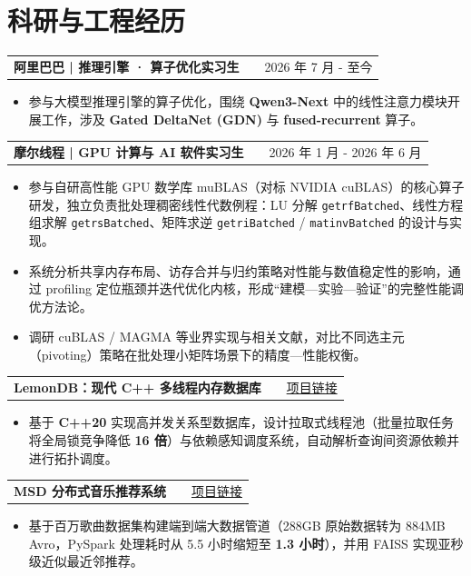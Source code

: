 \documentclass[a4paper,12pt]{article}
\makeatletter
\newenvironment{joblong}[2]
    {
    \begin{tabularx}{\linewidth}{@{}l X r@{}}
    \textbf{#1} & \hfill &  #2 \\[3.75pt]
    \end{tabularx}
    \begin{minipage}[t]{\linewidth}
    \begin{itemize}[nosep,after=\strut, leftmargin=1em, itemsep=3pt,label=--]
    }
    {
    \end{itemize}
    \end{minipage}    
    }
\makeatother
\begin{document}

\section{科研与工程经历}

\begin{joblong}{阿里巴巴 | 推理引擎 · 算子优化实习生}{2026 年 7 月 - 至今}
\item 参与大模型推理引擎的算子优化，围绕 \textbf{Qwen3-Next} 中的线性注意力模块开展工作，涉及 \textbf{Gated DeltaNet (GDN)} 与 \textbf{fused-recurrent} 算子。
\end{joblong}

\begin{joblong}{摩尔线程 | GPU 计算与 AI 软件实习生}{2026 年 1 月 - 2026 年 6 月}
\item 参与自研高性能 GPU 数学库 muBLAS（对标 NVIDIA cuBLAS）的核心算子研发，独立负责批处理稠密线性代数例程：LU 分解 \texttt{getrfBatched}、线性方程组求解 \texttt{getrsBatched}、矩阵求逆 \texttt{getriBatched} / \texttt{matinvBatched} 的设计与实现。
\item 系统分析共享内存布局、访存合并与归约策略对性能与数值稳定性的影响，通过 profiling 定位瓶颈并迭代优化内核，形成“建模—实验—验证”的完整性能调优方法论。
\item 调研 cuBLAS / MAGMA 等业界实现与相关文献，对比不同选主元（pivoting）策略在批处理小矩阵场景下的精度—性能权衡。
\end{joblong}

\begin{joblong}{LemonDB：现代 C++ 多线程内存数据库}{\href{https://github.com/zty2004/ECE4821Jp2}{项目链接}}
\item 基于 \textbf{C++20} 实现高并发关系型数据库，设计拉取式线程池（批量拉取任务将全局锁竞争降低 \textbf{16 倍}）与依赖感知调度系统，自动解析查询间资源依赖并进行拓扑调度。
\end{joblong}

\begin{joblong}{MSD 分布式音乐推荐系统}{\href{https://github.com/zty2004/ECE4721J}{项目链接}}
\item 基于百万歌曲数据集构建端到端大数据管道（288GB 原始数据转为 884MB Avro，PySpark 处理耗时从 5.5 小时缩短至 \textbf{1.3 小时}），并用 FAISS 实现亚秒级近似最近邻推荐。
\end{joblong}
\end{document}
